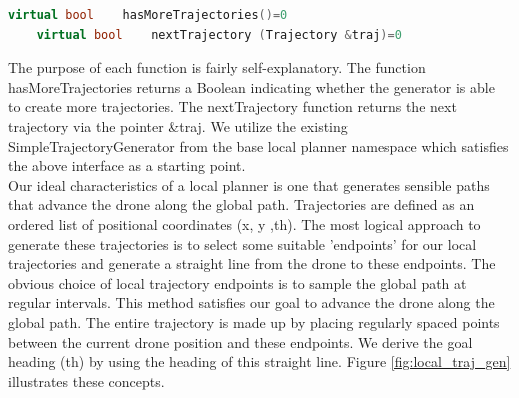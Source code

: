 \documentclass[capstone_report.tex]{subfiles}
\begin{document}
\begin{lstlisting}[language=c++]
    virtual bool    hasMoreTrajectories()=0
    virtual bool    nextTrajectory (Trajectory &traj)=0
\end{lstlisting}

The purpose of each function is fairly self-explanatory.  The function hasMoreTrajectories returns a Boolean indicating whether the generator is able to create more trajectories. The nextTrajectory function returns the next trajectory via the pointer \&traj.  We utilize the existing SimpleTrajectoryGenerator from the base local planner namespace which satisfies the above interface as a starting point.\\

Our ideal characteristics of a local planner is one that generates sensible paths that advance the drone along the global path.  Trajectories are defined as an ordered list of positional coordinates (x, y ,th).  The most logical approach to generate these trajectories is to select some suitable 'endpoints' for our local trajectories and generate a straight line from the drone to these endpoints.  The obvious choice of local trajectory endpoints is to sample the global path at regular intervals.  This method satisfies our goal to advance the drone along the global path.  The entire trajectory is made up by placing regularly spaced points between the current drone position and these endpoints.  We derive the goal heading (th) by using the heading of this straight line.  Figure \ref{fig:local_traj_gen} illustrates these concepts.
\end{document}
